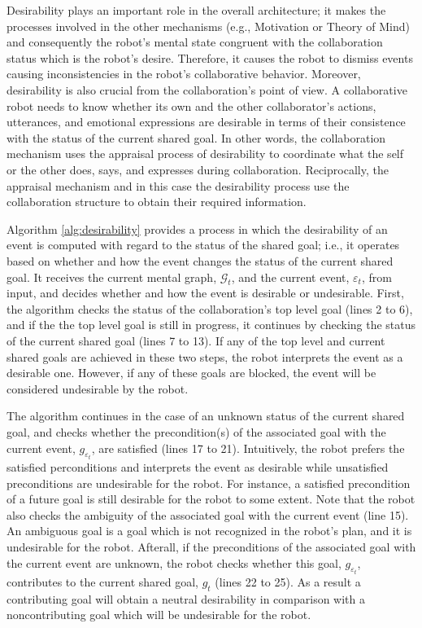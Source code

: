 \documentclass[letterpaper]{article}
\begin{document}
Desirability plays an important role in the overall architecture; it makes the
processes involved in the other mechanisms (e.g., Motivation or Theory of Mind)
and consequently the robot's mental state congruent with the collaboration
status which is the robot's desire. Therefore, it causes the robot to dismiss
events causing inconsistencies in the robot's collaborative behavior. Moreover,
desirability is also crucial from the collaboration's point of view. A
collaborative robot needs to know whether its own and the other collaborator's
actions, utterances, and emotional expressions are desirable in terms of their
consistence with the status of the current shared goal. In other words, the
collaboration mechanism uses the appraisal process of desirability to coordinate
what the self or the other does, says, and expresses during collaboration.
Reciprocally, the appraisal mechanism and in this case the desirability process
use the collaboration structure to obtain their required information.

Algorithm \ref{alg:desirability} provides a process in which the desirability of
an event is computed with regard to the status of the shared goal; i.e., it
operates based on whether and how the event changes the status of the current
shared goal. It receives the current mental graph, $\mathcal{G}_{t}$, and the
current event, $\varepsilon_t$, from input, and decides whether and how the
event is desirable or undesirable. First, the algorithm checks the status of the
collaboration's top level goal (lines 2 to 6), and if the the top level goal is
still in progress, it continues by checking the status of the current shared
goal (lines 7 to 13). If any of the top level and current shared goals are
achieved in these two steps, the robot interprets the event as a desirable one.
However, if any of these goals are blocked, the event will be considered
undesirable by the robot. 

The algorithm continues in the case of an unknown status of the current shared
goal, and checks whether the precondition(s) of the associated goal with the
current event, $\mathit{g}_{\varepsilon_t}$, are satisfied (lines 17 to 21).
Intuitively, the robot prefers the satisfied perconditions and interprets the
event as desirable while unsatisfied preconditions are undesirable for the
robot. For instance, a satisfied precondition of a future goal is still
desirable for the robot to some extent. Note that the robot also checks the
ambiguity of the associated goal with the current event (line 15). An ambiguous
goal is a goal which is not recognized in the robot's plan, and it is
undesirable for the robot. Afterall, if the preconditions of the associated goal
with the current event are unknown, the robot checks whether this goal,
$\mathit{g}_{\varepsilon_t}$, contributes to the current shared goal,
$\mathit{g}_{t}$ (lines 22 to 25). As a result a contributing goal will obtain a
neutral desirability in comparison with a noncontributing goal which will be
undesirable for the robot.
\end{document}
